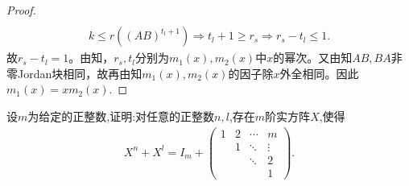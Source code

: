 \documentclass[../../main.tex]{subfiles}%
\begin{document}
\begin{proof}
\begin{align*}
\end{align*}
\begin{align*}
k \leqslant r\left( \left( AB \right)^{t_l + 1} \right) \Longrightarrow t_l + 1 \geqslant r_s \Longrightarrow r_s - t_l \leqslant 1.
\end{align*}
故$r_s - t_l = 1$。由知，$r_s,t_l$分别为$m_1(x),m_2(x)$中$x$的幂次。又由知$AB,BA$非零Jordan块相同，故再由知$m_1(x),m_2(x)$的因子除$x$外全相同。因此$m_1(x) = xm_2(x)$.
\end{proof}

\begin{example}
设$m$为给定的正整数,证明:对任意的正整数$n,l$,存在$m$阶实方阵$X$,使得
\begin{align*}
X^n + X^l = I_m + \begin{pmatrix}1 & 2 & \cdots & m\\ & 1 & \ddots & \vdots\\ & & \ddots & 2\\ & & & 1\end{pmatrix}.
\end{align*}
\end{example}
\end{document}
